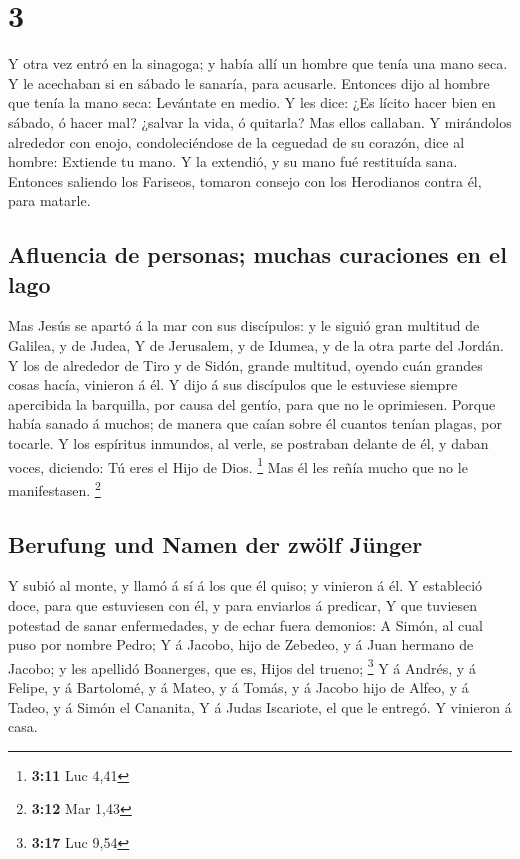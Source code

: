 \hypertarget{section-2}{%
\section{3}\label{section-2}}

 Y otra vez entró en la sinagoga; y había allí un hombre que
tenía una mano seca.  Y le acechaban si en sábado le
sanaría, para acusarle.  Entonces dijo al hombre que tenía
la mano seca: Levántate en medio.  Y les dice: ¿Es lícito
hacer bien en sábado, ó hacer mal? ¿salvar la vida, ó quitarla? Mas
ellos callaban.  Y mirándolos alrededor con enojo,
condoleciéndose de la ceguedad de su corazón, dice al hombre: Extiende
tu mano. Y la extendió, y su mano fué restituída sana. 
Entonces saliendo los Fariseos, tomaron consejo con los Herodianos
contra él, para matarle.

\hypertarget{afluencia-de-personas-muchas-curaciones-en-el-lago}{%
\subsection{Afluencia de personas; muchas curaciones en el
lago}\label{afluencia-de-personas-muchas-curaciones-en-el-lago}}

 Mas Jesús se apartó á la mar con sus discípulos: y le
siguió gran multitud de Galilea, y de Judea,  Y de
Jerusalem, y de Idumea, y de la otra parte del Jordán. Y los de
alrededor de Tiro y de Sidón, grande multitud, oyendo cuán grandes cosas
hacía, vinieron á él.  Y dijo á sus discípulos que le
estuviese siempre apercibida la barquilla, por causa del gentío, para
que no le oprimiesen.  Porque había sanado á muchos; de
manera que caían sobre él cuantos tenían plagas, por tocarle.
 Y los espíritus inmundos, al verle, se postraban delante
de él, y daban voces, diciendo: Tú eres el Hijo de Dios. \footnote{\textbf{3:11}
  Luc 4,41}  Mas él les reñía mucho que no le manifestasen.
\footnote{\textbf{3:12} Mar 1,43}

\hypertarget{berufung-und-namen-der-zwuxf6lf-juxfcnger}{%
\subsection{Berufung und Namen der zwölf
Jünger}\label{berufung-und-namen-der-zwuxf6lf-juxfcnger}}

 Y subió al monte, y llamó á sí á los que él quiso; y
vinieron á él.  Y estableció doce, para que estuviesen con
él, y para enviarlos á predicar,  Y que tuviesen potestad
de sanar enfermedades, y de echar fuera demonios:  A Simón,
al cual puso por nombre Pedro;  Y á Jacobo, hijo de
Zebedeo, y á Juan hermano de Jacobo; y les apellidó Boanerges, que es,
Hijos del trueno; \footnote{\textbf{3:17} Luc 9,54}  Y á
Andrés, y á Felipe, y á Bartolomé, y á Mateo, y á Tomás, y á Jacobo hijo
de Alfeo, y á Tadeo, y á Simón el Cananita,  Y á Judas
Iscariote, el que le entregó. Y vinieron á casa.

